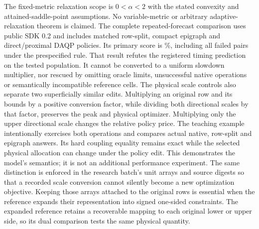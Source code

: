 The fixed-metric relaxation scope is $0<\alpha<2$ with the stated convexity
and attained-saddle-point assumptions. No variable-metric or arbitrary adaptive-
relaxation theorem is claimed. The complete repeated-forecast comparison uses
public SDK 0.2 and includes matched row-split, compact epigraph and direct/proximal
DAQP policies. Its primary score is \PrimaryEstimate\%, including all failed
pairs under the prespecified rule. That result refutes the registered timing
prediction on the tested population. It cannot be converted to a uniform
slowdown multiplier, nor rescued by omitting oracle limits, unsuccessful native
operations or semantically incompatible reference cells.
The physical scale controls also separate two superficially similar edits.
Multiplying an original row and its bounds by a positive conversion factor,
while dividing both directional scales by that factor, preserves the peak
and physical optimizer. Multiplying only the upper directional scale changes
the relative policy price. The teaching example intentionally exercises both
operations and compares actual native, row-split and epigraph answers. Its
hard coupling equality remains exact while the selected physical allocation
can change under the policy edit. This demonstrates the model's semantics;
it is not an additional performance experiment. The same distinction is
enforced in the research batch's unit arrays and source digests so that a
recorded scale conversion cannot silently become a new optimization objective.
Keeping those arrays attached to the original rows is essential when the
reference expands their representation into signed one-sided constraints.
The expanded reference retains a recoverable mapping to each original lower
or upper side, so its dual comparison tests the same physical quantity.
